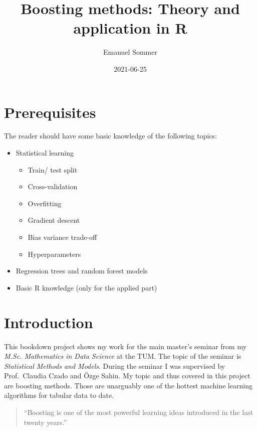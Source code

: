 \documentclass[
]{book}
\title{Boosting methods: Theory and application in R}
\author{Emanuel Sommer}
\date{2021-06-25}
\begin{document}
\maketitle

{
\setcounter{tocdepth}{1}
\tableofcontents
}
\hypertarget{prerequisites}{%
\chapter{Prerequisites}\label{prerequisites}}

The reader should have some basic knowledge of the following topics:

\begin{itemize}
\item
  Statistical learning

  \begin{itemize}
  \item
    Train/ test split
  \item
    Cross-validation
  \item
    Overfitting
  \item
    Gradient descent
  \item
    Bias variance trade-off
  \item
    Hyperparameters
  \end{itemize}
\item
  Regression trees and random forest models
\item
  Basic R knowledge (only for the applied part)
\end{itemize}

\hypertarget{intro}{%
\chapter{Introduction}\label{intro}}

This bookdown project shows my work for the main master's seminar from my \emph{M.Sc. Mathematics in Data Science} at the TUM. The topic of the seminar is \emph{Statistical Methods and Models}. During the seminar I was supervised by Prof.~Claudia Czado and Özge Sahin. My topic and thus covered in this project are boosting methods. Those are unarguably one of the hottest machine learning algorithms for tabular data to date.

\begin{quote}
``Boosting is one of the most powerful learning ideas introduced in the last
twenty years.'' \citep{elements}
\end{quote}
\end{document}

